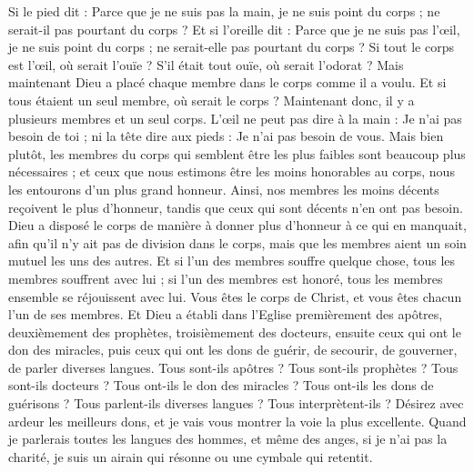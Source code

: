 \begin{multicols}{2}
Si le pied dit : Parce que je ne suis pas la main, je ne suis point du corps ; ne serait-il pas pourtant du corps ?
Et si l'oreille dit : Parce que je ne suis pas l’œil, je ne suis point du corps ; ne serait-elle pas pourtant du corps ?
Si tout le corps est l’œil, où serait l'ouïe ? S’il était tout ouïe, où serait l'odorat ?
Mais maintenant Dieu a placé chaque membre dans le corps comme il a voulu.
Et si tous étaient un seul membre, où serait le corps ?
Maintenant donc, il y a plusieurs membres et un seul corps.
L’œil ne peut pas dire à la main : Je n'ai pas besoin de toi ; ni la tête dire aux pieds : Je n'ai pas besoin de vous.
Mais bien plutôt, les membres du corps qui semblent être les plus faibles sont beaucoup plus nécessaires ;
et ceux que nous estimons être les moins honorables au corps, nous les entourons d’un plus grand honneur. Ainsi, nos membres les moins décents reçoivent le plus d’honneur,
tandis que ceux qui sont décents n’en ont pas besoin. Dieu a disposé le corps de manière à donner plus d’honneur à ce qui en manquait,
afin qu'il n'y ait pas de division dans le corps, mais que les membres aient un soin mutuel les uns des autres.
Et si l'un des membres souffre quelque chose, tous les membres souffrent avec lui ; si l'un des membres est honoré, tous les membres ensemble se réjouissent avec lui.
Vous êtes le corps de Christ, et vous êtes chacun l’un de ses membres.
Et Dieu a établi dans l'Eglise premièrement des apôtres, deuxièmement des prophètes, troisièmement des docteurs, ensuite ceux qui ont le don des miracles, puis ceux qui ont les dons de guérir, de secourir, de gouverner, de parler diverses langues.
Tous sont-ils apôtres ? Tous sont-ils prophètes ? Tous sont-ils docteurs ? Tous ont-ils le don des miracles ?
Tous ont-ils les dons de guérisons ? Tous parlent-ils diverses langues ? Tous interprètent-ils ?
Désirez avec ardeur les meilleurs dons, et je vais vous montrer la voie la plus excellente.
\VerseOne{}Quand je parlerais toutes les langues des hommes, et même des anges, si je n'ai pas la charité, je suis un airain qui résonne ou une cymbale qui retentit.

\end{multicols}
